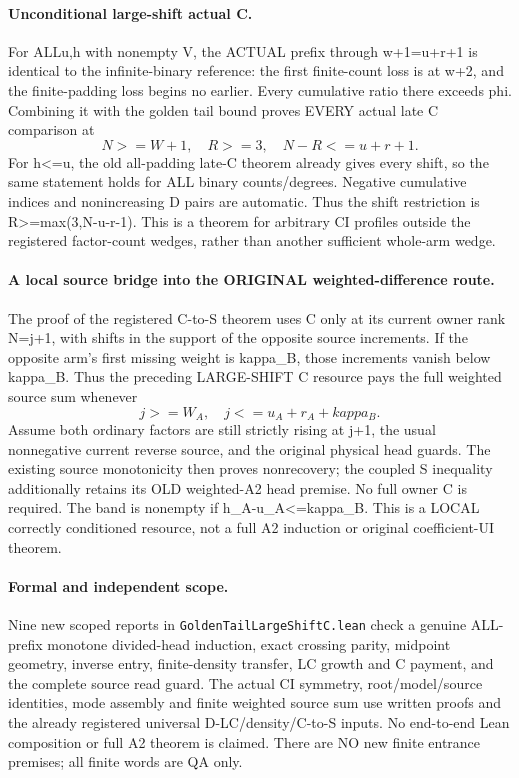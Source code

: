 \paragraph{Unconditional large-shift actual C.}
For ALLu,h with nonempty V, the ACTUAL prefix through w+1=u+r+1
is identical to the infinite-binary reference: the first finite-count
loss is at w+2, and the finite-padding loss begins no earlier.
Every cumulative ratio there exceeds phi. Combining it with the
golden tail bound proves EVERY actual late C comparison at
\[
 N>=W+1,\quad R>=3,\quad N-R<=u+r+1.
\]
For h<=u, the old all-padding late-C theorem already gives every
shift, so the same statement holds for ALL binary counts/degrees.
Negative cumulative indices and nonincreasing D pairs are automatic.
Thus the shift restriction is R>=max(3,N-u-r-1).
This is a theorem for arbitrary CI profiles outside the registered
factor-count wedges, rather than another sufficient whole-arm wedge.

\paragraph{A local source bridge into the ORIGINAL weighted-difference route.}
The proof of the registered C-to-S theorem uses C only at its current
owner rank N=j+1, with shifts in the support of the opposite source
increments. If the opposite arm's first missing weight is kappa_B,
those increments vanish below kappa_B. Thus the preceding LARGE-SHIFT
C resource pays the full weighted source sum whenever
\[
 j>=W_A,\quad j<=u_A+r_A+kappa_B.
\]
Assume both ordinary factors are still strictly rising at j+1, the
usual nonnegative current reverse source, and the original physical
head guards. The existing source monotonicity then proves nonrecovery;
the coupled S inequality additionally retains its OLD weighted-A2 head
premise. No full owner C is required. The band is nonempty if
h_A-u_A<=kappa_B. This is a LOCAL correctly conditioned resource,
not a full A2 induction or original coefficient-UI theorem.

\paragraph{Formal and independent scope.}
Nine new scoped reports in \texttt{GoldenTailLargeShiftC.lean}
check a genuine ALL-prefix monotone divided-head induction, exact
crossing parity, midpoint geometry, inverse entry, finite-density
transfer, LC growth and C payment, and the complete source read guard.
The actual CI symmetry, root/model/source identities, mode assembly
and finite weighted source sum use written proofs and the already
registered universal D-LC/density/C-to-S inputs. No end-to-end Lean
composition or full A2 theorem is claimed. There are NO new finite
entrance premises; all finite words are QA only.

